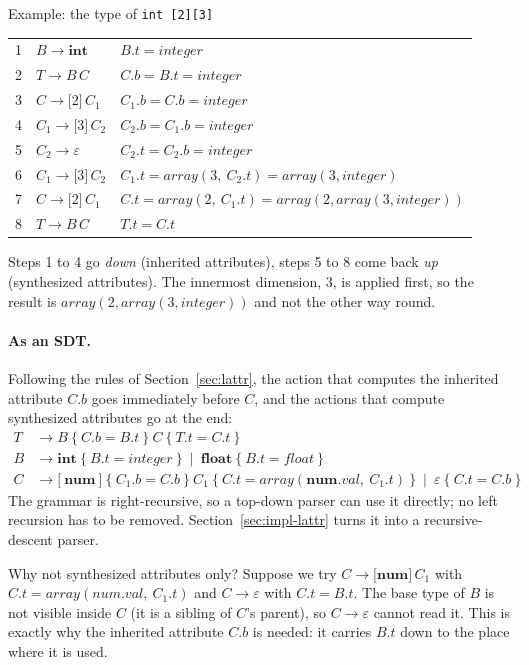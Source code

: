 \documentclass[11pt,a4paper]{article}
\newcommand{\at}[2]{\ensuremath{#1.\mathit{#2}}}
\newcommand{\tok}[1]{\ensuremath{\mathtt{#1}}}
\begin{document}
\begin{examplebox}{Example: the type of \texttt{int [2][3]}}
\begin{center}
\begin{tabular}{@{}c l l@{}}
1 & $B\to\mathbf{int}$ & $B.t=\mathit{integer}$ \\
2 & $T\to B\,C$ & $C.b=B.t=\mathit{integer}$ \\
3 & $C\to\tok{[}2\tok{]}\,C_1$ & $C_1.b=C.b=\mathit{integer}$ \\
4 & $C_1\to\tok{[}3\tok{]}\,C_2$ & $C_2.b=C_1.b=\mathit{integer}$ \\
5 & $C_2\to\varepsilon$ & $C_2.t=C_2.b=\mathit{integer}$ \\
6 & $C_1\to\tok{[}3\tok{]}\,C_2$ & $C_1.t=\mathit{array}(3,\ C_2.t)=\mathit{array}(3,\mathit{integer})$ \\
7 & $C\to\tok{[}2\tok{]}\,C_1$ & $C.t=\mathit{array}(2,\ C_1.t)=\mathit{array}(2,\mathit{array}(3,\mathit{integer}))$ \\
8 & $T\to B\,C$ & $T.t=C.t$ \\ \bottomrule
\end{tabular}
\end{center}
Steps 1 to 4 go \emph{down} (inherited attributes), steps 5 to 8 come back \emph{up} (synthesized attributes). The innermost dimension, 3, is applied first, so the result is $\mathit{array}(2,\mathit{array}(3,\mathit{integer}))$ and not the other way round.
\end{examplebox}

\paragraph{As an SDT.} Following the rules of Section~\ref{sec:lattr}, the action that computes the inherited attribute $C.b$ goes immediately before $C$, and the actions that compute synthesized attributes go at the end:
\begin{align*}
T &\to B\ \{\ \at{C}{b}=\at{B}{t}\ \}\ C\ \{\ \at{T}{t}=\at{C}{t}\ \}\\
B &\to \mathbf{int}\ \{\ \at{B}{t}=\mathit{integer}\ \}\ \mid\ \mathbf{float}\ \{\ \at{B}{t}=\mathit{float}\ \}\\
C &\to \tok{[}\ \mathbf{num}\ \tok{]}\ \{\ \at{C_1}{b}=\at{C}{b}\ \}\ C_1\ \{\ \at{C}{t}=\mathit{array}(\at{\mathbf{num}}{val},\ \at{C_1}{t})\ \}\ \mid\ \varepsilon\ \{\ \at{C}{t}=\at{C}{b}\ \}
\end{align*}
The grammar is right-recursive, so a top-down parser can use it directly; no left recursion has to be removed. Section~\ref{sec:impl-lattr} turns it into a recursive-descent parser.

\begin{pitfallbox}{Why not synthesized attributes only?}
Suppose we try $C\to\tok{[}\mathbf{num}\tok{]}\,C_1$ with $C.t=\mathit{array}(num.val,\ C_1.t)$ and $C\to\varepsilon$ with $C.t=B.t$. The base type of $B$ is not visible inside $C$ (it is a sibling of $C$'s parent), so $C\to\varepsilon$ cannot read it. This is exactly why the inherited attribute $C.b$ is needed: it carries $B.t$ down to the place where it is used.
\end{pitfallbox}
\end{document}
